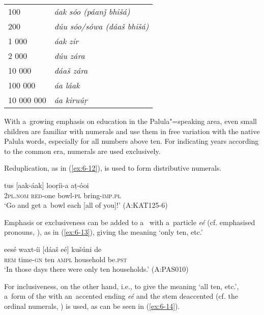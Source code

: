 {\begin{table}[H]
\begin{tabularx}{\textwidth}{ l@{\hspace{40pt}} Q }
100 &
\sffamily \textrm{\textit{áak sóo (páanǰ bhišá)}} \\
200 &
\sffamily \textrm{\textit{dúu sóo/sówa (dáaš bhišá)}}\\
1 000 &
\sffamily \textrm{\textit{áak zir}}\\
2 000 &
\sffamily \textrm{\textit{dúu zára}}\\
10 000 &
\sffamily \textrm{\textit{dáaš zára}}\\
100 000 &
\sffamily \textrm{\textit{áa láak}}\\
10 000 000 &
\sffamily \textrm{\textit{áa kiruúṛ}}\\
\end{tabularx}
\end{table}

With a~growing emphasis on education in the Palula"=speaking area, even small children are familiar
with  numerals and use them in free variation with the native Palula words, especially for all
numbers above ten. For indicating years according to the common era,  numerals are used
exclusively.

Reduplication, as in (\ref{ex:6-12}), is used to form distributive numerals.

\begin{exe}
\ex
\label{ex:6-12}
\gll tus [aak-áak] looṛíi-a aṭ-óoi \\
\textsc{2pl.nom} \textsc{red}-one bowl-\textsc{pl} bring-\textsc{imp.pl} \\
\glt `Go and get a~bowl each [all of you]!' (A:KAT125-6)
\end{exe}

Emphasis or exclusiveness can be added to a~ with a~particle \textit{eé} (cf. emphasised pronouns, ), as in (\ref{ex:6-13}), giving the meaning `only ten, etc.'

\begin{exe}
\ex
\label{ex:6-13}
\gll eesé waxt-íi [dáaš eé] kušúni de \\
\textsc{rem} time-\textsc{gn} ten \textsc{ampl} household be.\textsc{pst} \\
\glt `In those days there were only ten households.' (A:PAS010)
\end{exe}

For inclusiveness, on the other hand, i.e., to give the meaning `all ten, etc.', a~form of the  with an~accented ending \textit{eé} and the  stem deaccented (cf. the ordinal numerals, ) is used, as can be seen in (\ref{ex:6-14}).

}
